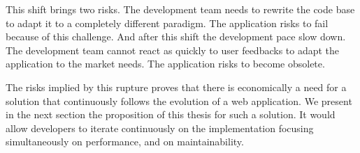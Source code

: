

This shift brings two risks.
The development team needs to rewrite the code base to adapt it to a completely different paradigm.
The application risks to fail because of this challenge.
And after this shift the development pace slow down.
The development team cannot react as quickly to user feedbacks to adapt the application to the market needs.
The application risks to become obsolete.



The risks implied by this rupture proves that there is economically a need for a solution that continuously follows the evolution of a web application.
We present in the next section the proposition of this thesis for such a solution.
It would allow developers to iterate continuously on the implementation focusing simultaneously on performance, and on maintainability.



\endinput









